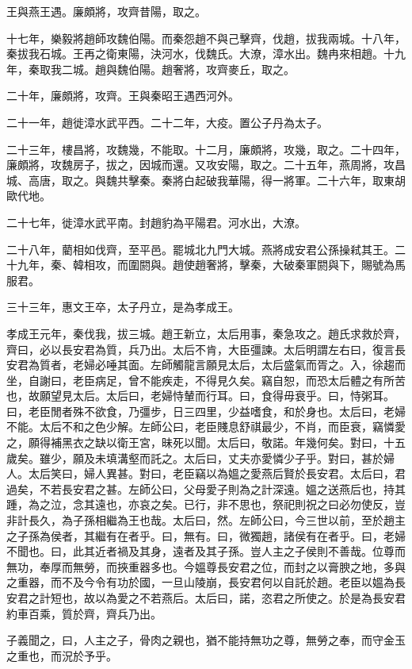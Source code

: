 王與燕王遇。廉頗將，攻齊昔陽，取之。

十七年，樂毅將趙師攻魏伯陽。而秦怨趙不與己擊齊，伐趙，拔我兩城。十八年，秦拔我石城。王再之衛東陽，決河水，伐魏氏。大潦，漳水出。魏冉來相趙。十九年，秦取我二城。趙與魏伯陽。趙奢將，攻齊麥丘，取之。

二十年，廉頗將，攻齊。王與秦昭王遇西河外。

二十一年，趙徙漳水武平西。二十二年，大疫。置公子丹為太子。

二十三年，樓昌將，攻魏幾，不能取。十二月，廉頗將，攻幾，取之。二十四年，廉頗將，攻魏房子，拔之，因城而還。又攻安陽，取之。二十五年，燕周將，攻昌城、高唐，取之。與魏共擊秦。秦將白起破我華陽，得一將軍。二十六年，取東胡歐代地。

二十七年，徙漳水武平南。封趙豹為平陽君。河水出，大潦。

二十八年，藺相如伐齊，至平邑。罷城北九門大城。燕將成安君公孫操弒其王。二十九年，秦、韓相攻，而圍閼與。趙使趙奢將，擊秦，大破秦軍閼與下，賜號為馬服君。

三十三年，惠文王卒，太子丹立，是為孝成王。

孝成王元年，秦伐我，拔三城。趙王新立，太后用事，秦急攻之。趙氏求救於齊，齊曰，必以長安君為質，兵乃出。太后不肯，大臣彊諫。太后明謂左右曰，復言長安君為質者，老婦必唾其面。左師觸龍言願見太后，太后盛氣而胥之。入，徐趨而坐，自謝曰，老臣病足，曾不能疾走，不得見久矣。竊自恕，而恐太后體之有所苦也，故願望見太后。太后曰，老婦恃輦而行耳。曰，食得毋衰乎。曰，恃粥耳。曰，老臣閒者殊不欲食，乃彊步，日三四里，少益嗜食，和於身也。太后曰，老婦不能。太后不和之色少解。左師公曰，老臣賤息舒祺最少，不肖，而臣衰，竊憐愛之，願得補黑衣之缺以衛王宮，昧死以聞。太后曰，敬諾。年幾何矣。對曰，十五歲矣。雖少，願及未填溝壑而託之。太后曰，丈夫亦愛憐少子乎。對曰，甚於婦人。太后笑曰，婦人異甚。對曰，老臣竊以為媼之愛燕后賢於長安君。太后曰，君過矣，不若長安君之甚。左師公曰，父母愛子則為之計深遠。媼之送燕后也，持其踵，為之泣，念其遠也，亦哀之矣。已行，非不思也，祭祀則祝之曰必勿使反，豈非計長久，為子孫相繼為王也哉。太后曰，然。左師公曰，今三世以前，至於趙主之子孫為侯者，其繼有在者乎。曰，無有。曰，微獨趙，諸侯有在者乎。曰，老婦不聞也。曰，此其近者禍及其身，遠者及其子孫。豈人主之子侯則不善哉。位尊而無功，奉厚而無勞，而挾重器多也。今媼尊長安君之位，而封之以膏腴之地，多與之重器，而不及今令有功於國，一旦山陵崩，長安君何以自託於趙。老臣以媼為長安君之計短也，故以為愛之不若燕后。太后曰，諾，恣君之所使之。於是為長安君約車百乘，質於齊，齊兵乃出。

子義聞之，曰，人主之子，骨肉之親也，猶不能持無功之尊，無勞之奉，而守金玉之重也，而況於予乎。

